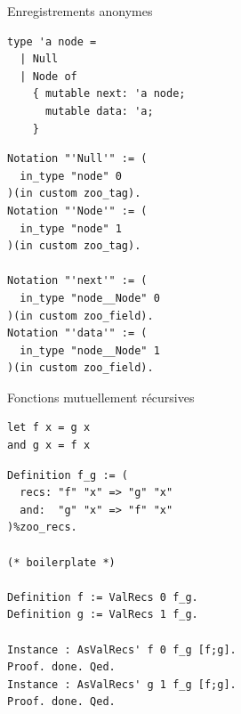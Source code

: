 \begin{frame}[fragile]{Enregistrements anonymes}
\begin{minipage}{0.49\textwidth}
  \begin{verbatim}
type 'a node =
  | Null
  | Node of
    { mutable next: 'a node;
      mutable data: 'a;
    }
  \end{verbatim}
\end{minipage}
\begin{minipage}{0.5\textwidth}
  \begin{verbatim}
Notation "'Null'" := (
  in_type "node" 0
)(in custom zoo_tag).
Notation "'Node'" := (
  in_type "node" 1
)(in custom zoo_tag).

Notation "'next'" := (
  in_type "node__Node" 0
)(in custom zoo_field).
Notation "'data'" := (
  in_type "node__Node" 1
)(in custom zoo_field).
  \end{verbatim}
\end{minipage}
\end{frame}

\begin{frame}[fragile]{Fonctions mutuellement récursives}
\begin{minipage}{0.49\textwidth}
  \begin{verbatim}
let f x = g x
and g x = f x
  \end{verbatim}
\end{minipage}
\begin{minipage}{0.5\textwidth}
  \begin{verbatim}
Definition f_g := (
  recs: "f" "x" => "g" "x"
  and:  "g" "x" => "f" "x"
)%zoo_recs.

(* boilerplate *)

Definition f := ValRecs 0 f_g.
Definition g := ValRecs 1 f_g.

Instance : AsValRecs' f 0 f_g [f;g].
Proof. done. Qed.
Instance : AsValRecs' g 1 f_g [f;g].
Proof. done. Qed.
  \end{verbatim}
\end{minipage}
\end{frame}

